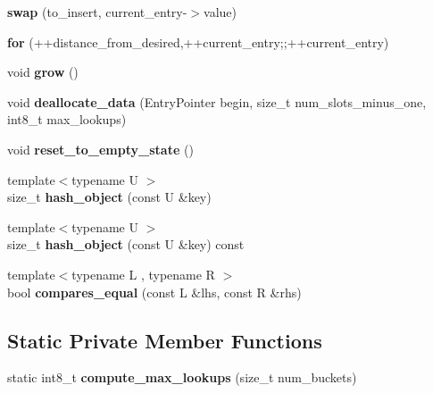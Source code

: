 \begin{DoxyCompactItemize}
\item 
{\bfseries swap} (to\+\_\+insert, current\+\_\+entry-\/$>$value)\label{classska_1_1detailv3_1_1sherwood__v3__table_a87f3c74a2acbddcc8d89da67227ebf44}

\item 
{\bfseries for} (++distance\+\_\+from\+\_\+desired,++current\+\_\+entry;;++current\+\_\+entry)\label{classska_1_1detailv3_1_1sherwood__v3__table_a506dd91bb8f538c62f13a2e253501698}

\item 
void {\bfseries grow} ()\label{classska_1_1detailv3_1_1sherwood__v3__table_aae7057e0e02182ebfb6f1af6eafb8c7a}

\item 
void {\bfseries deallocate\+\_\+data} (Entry\+Pointer begin, size\+\_\+t num\+\_\+slots\+\_\+minus\+\_\+one, int8\+\_\+t max\+\_\+lookups)\label{classska_1_1detailv3_1_1sherwood__v3__table_a1011f360b048cebd083665d2f167d5e2}

\item 
void {\bfseries reset\+\_\+to\+\_\+empty\+\_\+state} ()\label{classska_1_1detailv3_1_1sherwood__v3__table_a7bdbcd192ce21a8e9387d0f1813c1df7}

\item 
{\footnotesize template$<$typename U $>$ }\\size\+\_\+t {\bfseries hash\+\_\+object} (const U \&key)\label{classska_1_1detailv3_1_1sherwood__v3__table_af8223a9d5081379c092eae7d28f40ea2}

\item 
{\footnotesize template$<$typename U $>$ }\\size\+\_\+t {\bfseries hash\+\_\+object} (const U \&key) const \label{classska_1_1detailv3_1_1sherwood__v3__table_a53c778c0f19e6068493caa1eef933949}

\item 
{\footnotesize template$<$typename L , typename R $>$ }\\bool {\bfseries compares\+\_\+equal} (const L \&lhs, const R \&rhs)\label{classska_1_1detailv3_1_1sherwood__v3__table_a793b987a5fe980380c3747275022cb91}

\end{DoxyCompactItemize}
\subsection*{Static Private Member Functions}
\begin{DoxyCompactItemize}
\item 
static int8\+\_\+t {\bfseries compute\+\_\+max\+\_\+lookups} (size\+\_\+t num\+\_\+buckets)\label{classska_1_1detailv3_1_1sherwood__v3__table_aee430fb4a4044b4788a9610d866b9083}

\end{DoxyCompactItemize}
